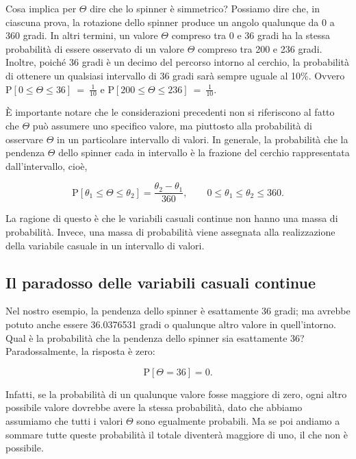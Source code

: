 \documentclass[
  11pt,
]{krantz}
\theoremstyle{definition}
\theoremstyle{definition}
\theoremstyle{definition}
\theoremstyle{definition}
\theoremstyle{remark}
\begin{document}
Cosa implica per \(\Theta\) dire che lo spinner è simmetrico? Possiamo dire che, in ciascuna prova, la rotazione dello spinner produce un angolo qualunque da 0 a 360 gradi. In altri termini, un valore \(\Theta\) compreso tra 0 e 36 gradi ha la stessa probabilità di essere osservato di un valore \(\Theta\) compreso tra 200 e 236 gradi. Inoltre, poiché 36 gradi è un decimo del percorso intorno al cerchio, la probabilità di ottenere un qualsiasi intervallo di 36 gradi sarà sempre uguale al 10\%. Ovvero \(\mbox{P}[0 \leq \Theta \leq 36] \ = \ \frac{1}{10}\) e \(\mbox{P}[200 \leq \Theta \leq 236] \ = \ \frac{1}{10}\).

È importante notare che le considerazioni precedenti non si riferiscono al fatto che \(\Theta\) può assumere uno specifico valore, ma piuttosto alla probabilità di osservare \(\Theta\) in un particolare intervallo di valori. In generale, la probabilità che la pendenza \(\Theta\) dello spinner cada in intervallo è la frazione del cerchio rappresentata dall'intervallo, cioè,

\[
\mbox{P}[\theta_1 \leq \Theta \leq \theta_2] = \frac{\theta_2 - \theta_1}{360}, \qquad 0 \leq \theta_1 \leq \theta_2 \leq 360.
\]

La ragione di questo è che le variabili casuali continue non hanno una massa di probabilità. Invece, una massa di probabilità viene assegnata alla realizzazione della variabile casuale in un intervallo di valori.

\hypertarget{il-paradosso-delle-variabili-casuali-continue}{%
\subsection{Il paradosso delle variabili casuali continue}\label{il-paradosso-delle-variabili-casuali-continue}}

Nel nostro esempio, la pendenza dello spinner è esattamente 36 gradi; ma avrebbe potuto anche essere 36.0376531 gradi o qualunque altro valore in quell'intorno. Qual è la probabilità che la pendenza dello spinner sia esattamente 36? Paradossalmente, la risposta è zero:

\[
\mbox{P}[\Theta = 36] = 0.
\]

Infatti, se la probabilità di un qualunque valore fosse maggiore di zero, ogni altro possibile valore dovrebbe avere la stessa probabilità, dato che abbiamo assumiamo che tutti i valori \(\Theta\) sono egualmente probabili. Ma se poi andiamo a sommare tutte queste probabilità il totale diventerà maggiore di uno, il che non è possibile.
\end{document}
